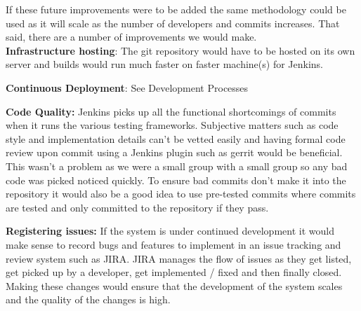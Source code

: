 \documentclass[a4paper,11pt]{article}
\begin{document}
If these future improvements were to be added the same methodology could be used as it will scale as the 
number of developers and commits increases. That said, there are a number of improvements we would make. 
\\

\textbf{Infrastructure hosting}: The git repository would have to be hosted on its own server and builds would run much faster on faster machine(s) for Jenkins.

\textbf{Continuous Deployment}: See Development Processes

\textbf{Code Quality:} Jenkins picks up all the functional shortcomings of commits when it runs the various testing frameworks. Subjective matters such as code style and implementation details can't be vetted easily and having formal code review upon commit using a Jenkins plugin such as gerrit would be beneficial. This wasn't a problem as we were a small group with a small group so any bad code was picked noticed quickly. To ensure bad commits don't make it into the repository it would also be a good idea to use pre-tested commits where commits are tested and only committed to the repository if they pass.

\textbf{Registering issues:} If the system is under continued development it would make sense to record bugs and features to implement in an issue tracking and review system such as JIRA. JIRA manages the flow of issues as they get listed, get picked up by a developer, get implemented / fixed and then finally closed. 
Making these changes would ensure that the development of the system scales and the quality of the changes is high.
\end{document}
